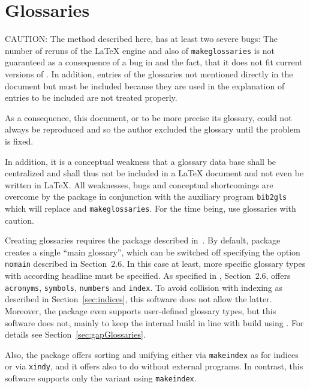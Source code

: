 \section{Glossaries}\label{sec:glossaries}

CAUTION\@: The method described here, 
has at least two severe bugs: 
The number of reruns of the \LaTeX{} engine and also of \texttt{makeglossaries} 
is not guaranteed as a consequence of a bug in  
and the fact, that it does not fit current versions of . 
In addition, entries of the glossaries not mentioned directly in the document 
but must be included because they are used in the explanation of entries to be included 
are not treated properly. 

As a consequence, this document, or to be more precise its glossary, 
could not always be reproduced and so the author excluded the glossary until the problem is fixed. 

In addition, it is a conceptual weakness that a glossary data base 
shall be centralized and shall thus not be included in a \LaTeX{} document 
and not even be written in \LaTeX. 
All weaknesses, bugs and conceptual shortcomings are overcome 
by the package  in conjunction with the auxiliary program \texttt{bib2gls} 
which will replace  and \texttt{makeglossaries}. 
For the time being, use glossaries with caution. 
\medskip


Creating glossaries 
requires the package  described in~\cite{GloP4_54}. 
By default, package  creates a single ``main glossary'', 
which can be switched off specifying the option \texttt{nomain} 
described in Section~2.6. 
In this case at least, more specific glossary types with according headline must be specified. 
As specified in \cite{GloP4_54}, Section~2.6, 
 offers \texttt{acronyms}, \texttt{symbols},
\texttt{numbers} and \texttt{index}. 
To avoid collision with indexing as described in Section~\ref{sec:indices}, 
this software does not allow the latter. 
Moreover, the package  even supports user-defined glossary types, 
but this software does not, 
mainly to keep the internal build in line with build using . 
For details see Section~\ref{sec:gapGlossaries}. 

Also, the package  offers sorting and unifying 
either via \texttt{makeindex} as for indices or via \texttt{xindy}, 
and it offers also to do without external programs. 
In contrast, this software supports only the variant using \texttt{makeindex}. 






